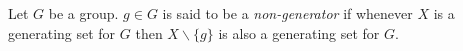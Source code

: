 \documentclass[12pt]{article}
\begin{document}
Let $G$ be a group.  $g\in G$ is said to be a \emph{non-generator} if whenever $X$ is a generating set for $G$ then $X\smallsetminus\{ g\}$ is also a generating set for $G$.
\end{document}
